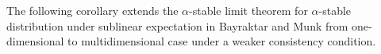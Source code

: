 \documentclass[a4paper,oneside,10pt]{article}%
\newtheorem{corollary}[theorem]{Corollary}
\newenvironment{proof}[1][Proof]{\noindent \textbf{#1.} }{\  \rule{0.5em}{0.5em}}
\numberwithin{equation}{section}
\begin{document}


The following corollary extends the $\alpha$-stable limit theorem for $\alpha
$-stable distribution under sublinear expectation in Bayraktar and Munk
\cite[Theorem 3.1]{BM2016} from one-dimensional to multidimensional case under
a weaker consistency condition.
\end{document}
